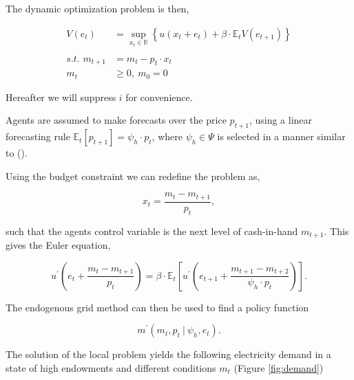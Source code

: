 \documentclass[american]{scrartcl}
\newcommand{\E}{\mathbb{E}}
\newcommand{\R}{\mathbb{R}}
\begin{document}
The dynamic optimization problem is then,

\begin{equation*}
    \begin{split}
        V(e_t) &= \sup_{x_t \in \R} \left\{u(x_t + e_t) + \beta \cdot \E_t V( e_{t+1} ) \right\} \\
        \\
        \textit{s.t. } m_{t+1} &= m_{t} - p_{t} \cdot x_{t}\\
        m_t  &\geq 0, \ m_0 = 0
    \end{split}
\end{equation*}

Hereafter we will suppress $i$ for convenience.

Agents are assumed to make forecasts over the price $p_{t+1}$, using a linear forecasting rule $\E_t[p_{t+1}] = \psi_h\cdot p_t$, where $\psi_h \in \Psi$ is selected in a manner similar to \citeauthor{Hommes2013} (\citeyear{Hommes2013}).

Using the budget constraint we can redefine the problem as,

\begin{equation}
    x_t = \frac{m_t - m_{t+1}}{p_t},
\end{equation}

such that the agents control variable is the next level of cash-in-hand $m_{t+1}$. This gives the Euler equation,

\begin{equation}
    u^\prime\left( e_t + \frac{m_t - m_{t+1}}{p_t} \right) = \beta \cdot \E_t \left[ u^\prime\left(e_{t+1} + \frac{m_{t+1} - m_{t+2}}{ \psi_h \cdot p_t} \right)  \right].
\end{equation}

The endogenous grid method can then be used to find a policy function

\begin{equation}
    m^\prime(m_t, p_t \ \vert \ \psi_h, e_t).
\end{equation}

The solution of the local problem yields the following electricity demand in a state of high endowments and different conditions $m_t$ (Figure \ref{fig:demand})
\end{document}
